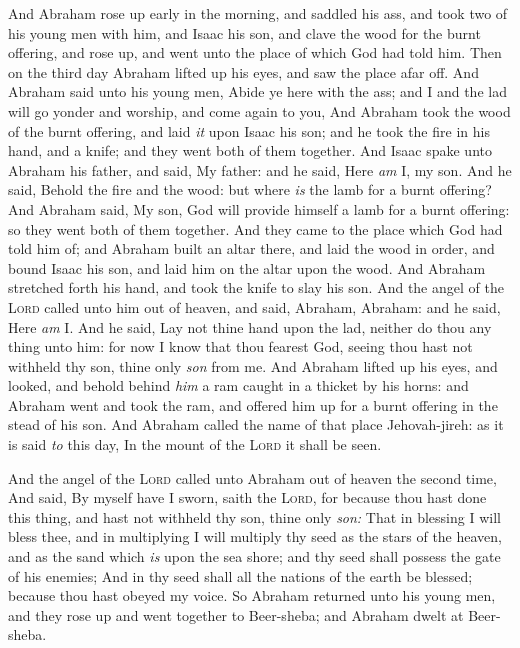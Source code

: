 \documentclass[11pt,letterpaper,oneside]{memoir}
\begin{document}
And Abraham rose up early in the morning, and saddled his ass, and took
two of his young men with him, and Isaac his son, and clave the wood for
the burnt offering, and rose up, and went unto the place of which God
had told him. Then on the third day Abraham lifted up his eyes, and saw
the place afar off. And Abraham said unto his young men, Abide ye here
with the ass; and I and the lad will go yonder and worship, and come
again to you, And Abraham took the wood of the burnt offering, and laid
\emph{it} upon Isaac his son; and he took the fire in his hand, and a
knife; and they went both of them together. And Isaac spake unto Abraham
his father, and said, My father: and he said, Here \emph{am} I, my son.
And he said, Behold the fire and the wood: but where \emph{is} the lamb
for a burnt offering? And Abraham said, My son, God will provide himself
a lamb for a burnt offering: so they went both of them together. And
they came to the place which God had told him of; and Abraham built an
altar there, and laid the wood in order, and bound Isaac his son, and
laid him on the altar upon the wood. And Abraham stretched forth his
hand, and took the knife to slay his son. And the angel of the
\textsc{Lord} called unto him out of heaven, and said, Abraham, Abraham:
and he said, Here \emph{am} I. And he said, Lay not thine hand upon the
lad, neither do thou any thing unto him: for now I know that thou
fearest God, seeing thou hast not withheld thy son, thine only
\emph{son} from me. And Abraham lifted up his eyes, and looked, and
behold behind \emph{him} a ram caught in a thicket by his horns: and
Abraham went and took the ram, and offered him up for a burnt offering
in the stead of his son. And Abraham called the name of that place
Jehovah-jireh: as it is said \emph{to} this day, In the mount of the
\textsc{Lord} it shall be seen.

And the angel of the \textsc{Lord} called unto Abraham out of heaven the
second time, And said, By myself have I sworn, saith the \textsc{Lord},
for because thou hast done this thing, and hast not withheld thy son,
thine only \emph{son: }That in blessing I will bless thee, and in
multiplying I will multiply thy seed as the stars of the heaven, and as
the sand which \emph{is} upon the sea shore; and thy seed shall possess
the gate of his enemies; And in thy seed shall all the nations of the
earth be blessed; because thou hast obeyed my voice. So Abraham returned
unto his young men, and they rose up and went together to Beer-sheba;
and Abraham dwelt at Beer-sheba.
\end{document}

